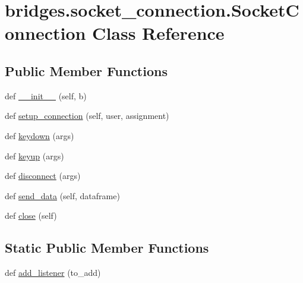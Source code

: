 \hypertarget{classbridges_1_1socket__connection_1_1_socket_connection}{}\section{bridges.\+socket\+\_\+connection.\+Socket\+Connection Class Reference}
\label{classbridges_1_1socket__connection_1_1_socket_connection}
\subsection*{Public Member Functions}
\begin{DoxyCompactItemize}
\item 
def \mbox{\hyperlink{classbridges_1_1socket__connection_1_1_socket_connection_ae241a5233f4cb8ad07e9a716ebfa3e55}{\+\_\+\+\_\+init\+\_\+\+\_\+}} (self, b)
\item 
def \mbox{\hyperlink{classbridges_1_1socket__connection_1_1_socket_connection_a346d70ef1084f4387df0f3027ac0f527}{setup\+\_\+connection}} (self, user, assignment)
\item 
def \mbox{\hyperlink{classbridges_1_1socket__connection_1_1_socket_connection_a6acd8ac3ac9d055de1ba086b447fbe7f}{keydown}} (args)
\item 
def \mbox{\hyperlink{classbridges_1_1socket__connection_1_1_socket_connection_a4ee952f67b32414fba663d5e9c53bf14}{keyup}} (args)
\item 
def \mbox{\hyperlink{classbridges_1_1socket__connection_1_1_socket_connection_a50b0181494d99f9a33bf7fb75c100842}{disconnect}} (args)
\item 
def \mbox{\hyperlink{classbridges_1_1socket__connection_1_1_socket_connection_a6f120b756e07aab0742ed42466984b31}{send\+\_\+data}} (self, dataframe)
\item 
def \mbox{\hyperlink{classbridges_1_1socket__connection_1_1_socket_connection_a38dd36c5ac674016d526e8cd2c515ac4}{close}} (self)
\end{DoxyCompactItemize}
\subsection*{Static Public Member Functions}
\begin{DoxyCompactItemize}
\item 
def \mbox{\hyperlink{classbridges_1_1socket__connection_1_1_socket_connection_a21d94eb97d7ea92e38dc8e78f1e40876}{add\+\_\+listener}} (to\+\_\+add)
\end{DoxyCompactItemize}
